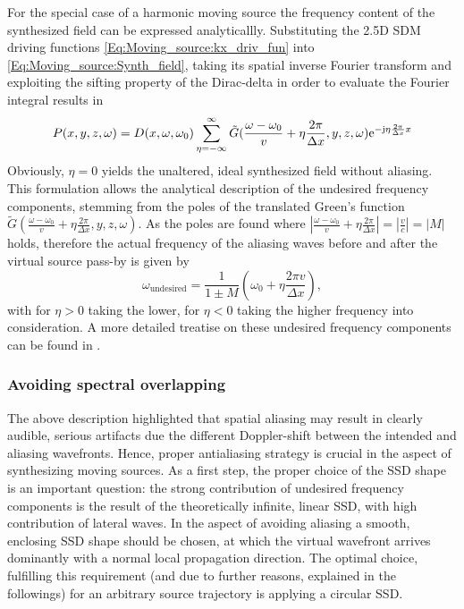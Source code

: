 For the special case of a harmonic moving source the frequency content of the synthesized field can be expressed analyticallly.
Substituting the 2.5D SDM driving functions \eqref{Eq:Moving_source:kx_driv_fun} into \eqref{Eq:Moving_source:Synth_field}, taking its spatial inverse Fourier transform and exploiting the sifting property of the Dirac-delta in order to evaluate the Fourier integral results in
\begin{equation}
P(x,y,z,\omega) = 
D(x,\omega,\omega_0)
\sum_{\eta = -\infty}^{\infty}
\tilde{G}( \frac{\omega-\omega_0}{v} +  \eta \frac{2\pi}{\Delta x},y,z, \omega )
 \mathrm{e}^{-\mathrm{j}  \eta \frac{2\pi}{\Delta x}  x}
\end{equation}
Obviously, $\eta = 0$ yields the unaltered, ideal synthesized field without aliasing.
This formulation allows the analytical description of the undesired frequency components, stemming from the poles of the translated Green's function $\tilde{G}( \frac{\omega-\omega_0}{v} +  \eta \frac{2\pi}{\Delta x},y,z, \omega )$.
As the poles are found where $|\frac{\omega-\omega_0}{v} +  \eta \frac{2\pi}{\Delta x}| = |\frac{v}{c}| = |M|$ holds, therefore the actual frequency of the aliasing waves before and after the virtual source pass-by is given by
\begin{equation}
\omega_{\mathrm{undesired}} = \frac{1}{1 \pm M} \left( \omega_0 + \eta \frac{2\pi v}{\Delta x} \right),
\end{equation}
with for $\eta > 0$ taking the lower, for $\eta < 0$ taking the higher frequency into consideration.
A more detailed treatise on these undesired frequency components can be found in \cite{firtha2016:daga}.

\subsubsection{Avoiding spectral overlapping}
The above description highlighted that spatial aliasing may result in clearly audible, serious artifacts due the different Doppler-shift between the intended and aliasing wavefronts.
Hence, proper antialiasing strategy is crucial in the aspect of synthesizing moving sources.
As a first step, the proper choice of the SSD shape is an important question: the strong contribution of undesired frequency components is the result of the theoretically infinite, linear SSD, with high contribution of lateral waves.
In the aspect of avoiding aliasing a smooth, enclosing SSD shape should be chosen, at which the virtual wavefront arrives dominantly with a normal local propagation direction.
The optimal choice, fulfilling this requirement (and due to further reasons, explained in the followings) for an arbitrary source trajectory is applying a circular SSD.

